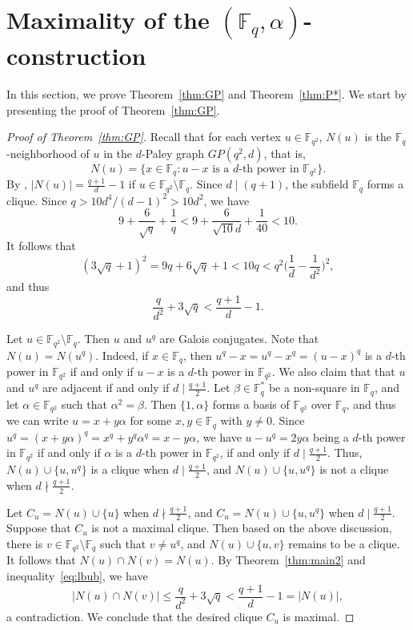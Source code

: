 \documentclass[12pt,reqno]{amsart}
\theoremstyle{definition}
\newcommand{\F}{\mathbb{F}}
\begin{document}
\section{Maximality of the $(\mathbb{F}_q,\alpha)$-construction}\label{sec5}

In this section, we prove Theorem~\ref{thm:GP} and Theorem~\ref{thm:P*}. We start by presenting the proof of Theorem~\ref{thm:GP}.

\begin{proof}[Proof of Theorem~\ref{thm:GP}]
Recall that for each vertex $u \in \F_{q^2}$, $N(u)$ is the $\F_q$-neighborhood of $u$ in the $d$-Paley graph $GP(q^2,d)$, that is, 
$$
N(u)=\{x \in \F_q: u-x \text{ is a $d$-th power in } \F_{q^2}\}.
$$
By \cite[Proposition 4.6]{GSY23}, $|N(u)|=\frac{q+1}{d}-1$ if $u \in \F_{q^2}\setminus \F_q$. Since $d \mid (q+1)$, the subfield $\F_q$ forms a clique. Since $q>10d^4/(d-1)^2>10d^2$, we have
$$
9+\frac{6}{\sqrt{q}}+\frac{1}{q}<9+\frac{6}{\sqrt{10}d}+\frac{1}{40}<10.
$$
It follows that
$$
(3\sqrt{q}+1)^2=9q+6\sqrt{q}+1<10q<q^2\bigg(\frac{1}{d}-\frac{1}{d^2}\bigg)^2,
$$
and thus
\begin{equation}\label{eq:lbub}
\frac{q}{d^2}+3\sqrt{q}<\frac{q+1}{d}-1.    
\end{equation}

Let $u \in \F_{q^2} \setminus \F_q$. Then $u$ and $u^q$ are Galois conjugates. Note that $N(u)=N(u^q)$. Indeed, if $x \in \F_q$, then $u^q-x=u^q-x^q=(u-x)^q$ is a $d$-th power in $\F_{q^2}$ if and only if $u-x$ is a $d$-th power in $\F_{q^2}$. We also claim that that $u$ and $u^q$ are adjacent if and only if $d\mid \frac{q+1}{2}$. Let $\beta \in \F_q^*$ be a non-square in $\F_q$, and let $\alpha \in \F_{q^2}$ such that $\alpha^2=\beta$. Then $\{1,\alpha\}$ forms a basis of $\F_{q^2}$ over $\F_q$, and thus we can write $u=x+y\alpha$ for some $x,y \in \F_q$ with $y \neq 0$. Since $u^q=(x+y\alpha)^q=x^q+y^q\alpha^q=x-y\alpha$, we have $u-u^q=2y\alpha$ being a $d$-th power in $\F_{q^2}$ if and only if $\alpha$ is a $d$-th power in $\F_{q^2}$, if and only if $d\mid \frac{q+1}{2}$. Thus, $N(u) \cup \{u,u^q\}$ is a clique when $d \mid \frac{q+1}{2}$, and $N(u) \cup \{u,u^q\}$ is not a clique when $d\nmid \frac{q+1}{2}$.

Let $C_u=N(u) \cup \{u\}$ when $d\nmid \frac{q+1}{2}$, and $C_u=N(u) \cup \{u,u^q\}$ when $d\mid \frac{q+1}{2}$. Suppose that $C_u$ is not a maximal clique. Then based on the above discussion, there is $v \in \F_{q^2} \setminus \F_q$ such that $v \neq u^q$, and $N(u) \cup \{u,v\}$ remains to be a clique. It follows that $N(u) \cap N(v)=N(u)$. By Theorem~\ref{thm:main2} and inequality~\eqref{eq:lbub}, we have
$$
|N(u) \cap N(v)| \leq \frac{q}{d^2}+3\sqrt{q}<\frac{q+1}{d}-1=|N(u)|,
$$
a contradiction. We conclude that the desired clique $C_u$ is maximal.
\end{proof}
\end{document}
